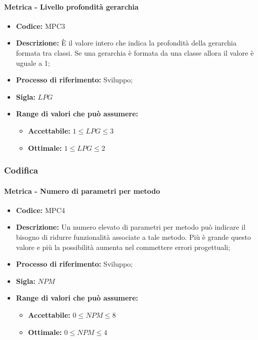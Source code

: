     \paragraph{Metrica - Livello profondità gerarchia}
    \begin{itemize}
        \item \textbf{Codice:} MPC3
        \item \textbf{Descrizione:} È il valore intero che indica la profondità della gerarchia formata tra classi. Se una gerarchia è formata da una classe allora il valore è uguale a 1;
        \item \textbf{Processo di riferimento:} Sviluppo;
        \item \textbf{Sigla:} $LPG$
        \item \textbf{Range di valori che può assumere:}
        \begin{itemize}
            \item \textbf{Accettabile:} $1 \leq{} LPG \leq 3$
            \item \textbf{Ottimale:} $1 \leq{} LPG \leq 2$
        \end{itemize}
    \end{itemize}

\subsubsection{Codifica}  
    \paragraph{Metrica - Numero di parametri per metodo} 
    \begin{itemize}
        \item \textbf{Codice:} MPC4
        \item \textbf{Descrizione:} Un numero elevato di parametri per metodo può indicare il bisogno di ridurre funzionalità associate a tale metodo. Più è grande questo valore e più la possibilità aumenta nel commettere errori progettuali;
        \item \textbf{Processo di riferimento:} Sviluppo;
        \item \textbf{Sigla:} $NPM$
        \item \textbf{Range di valori che può assumere:}
        \begin{itemize}
            \item \textbf{Accettabile:} $0 \leq{} NPM \leq 8$
            \item \textbf{Ottimale:} $0 \leq{} NPM \leq 4$
        \end{itemize}
    \end{itemize}

